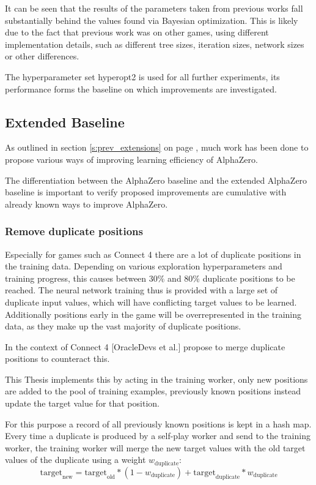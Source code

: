 \documentclass[12pt,onecolumn,oneside,titlepage]{article}
\begin{document}
It can be seen that the results of the parameters taken from previous works fall substantially behind the values found via Bayesian optimization. This is likely due to the fact that previous work was on other games, 
using different implementation details, such as different tree sizes, iteration sizes, network sizes or other differences.

The hyperparameter set hyperopt2 is used for all further experiments, its performance forms the baseline on which improvements are investigated.

\subsection{Extended Baseline} \label{s:exexp}

As outlined in section \ref{s:prev_extensions} on page \pageref{s:prev_extensions}, much work has been done to propose various ways of improving learning efficiency of AlphaZero. 

The differentiation between the AlphaZero baseline and the extended AlphaZero baseline is important to verify proposed improvements are cumulative with already known ways to improve AlphaZero.


\subsubsection{Remove duplicate positions}

Especially for games such as Connect 4 there are a lot of duplicate positions in the training data. Depending on various exploration hyperparameters and training progress, this causes between $30\%$ and $80\%$ duplicate positions to be reached.
The neural network training thus is provided with a large set of duplicate input values, which will have conflicting target values to be learned. Additionally positions early in the game will be overrepresented in the training data, as they make up the vast majority of
duplicate positions.

In the context of Connect 4 \cite{oracledevs6}[OracleDevs et al.] propose to merge duplicate positions to counteract this.

This Thesis implements this by acting in the training worker, only new positions are added to the pool of training examples, previously known positions instead update the target value
for that position.

For this purpose a record of all previously known positions is kept in a hash map.
Every time a duplicate is produced by a self-play worker and send to the training worker, the training worker will merge the new target values with the old target values of the duplicate using a weight
$w_{\text{duplicate}}$: $$\text{target}_{\text{new}} = \text{target}_{\text{old}} * (1 - w_{\text{duplicate}}) + \text{target}_{\text{duplicate}} * w_{\text{duplicate}}$$
\end{document}
